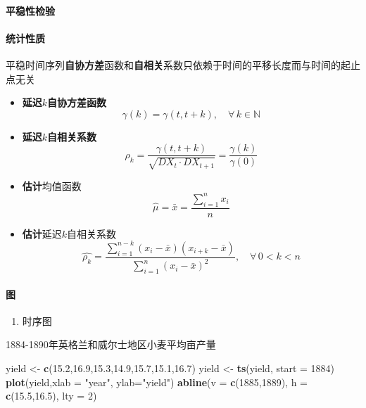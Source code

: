 \documentclass[]{article}
\newenvironment{Shaded}{\begin{snugshade}}{\end{snugshade}}
\newcommand{\DataTypeTok}[1]{\textcolor[rgb]{0.13,0.29,0.53}{#1}}
\newcommand{\DecValTok}[1]{\textcolor[rgb]{0.00,0.00,0.81}{#1}}
\newcommand{\FloatTok}[1]{\textcolor[rgb]{0.00,0.00,0.81}{#1}}
\newcommand{\KeywordTok}[1]{\textcolor[rgb]{0.13,0.29,0.53}{\textbf{#1}}}
\newcommand{\NormalTok}[1]{#1}
\newcommand{\StringTok}[1]{\textcolor[rgb]{0.31,0.60,0.02}{#1}}
\providecommand{\tightlist}{%
  \setlength{\itemsep}{0pt}\setlength{\parskip}{0pt}}
\let\oldparagraph\paragraph
\renewcommand{\paragraph}[1]{\oldparagraph{#1}\mbox{}}
\begin{document}
\hypertarget{ux5e73ux7a33ux6027ux68c0ux9a8c}{%
\paragraph{平稳性检验}\label{ux5e73ux7a33ux6027ux68c0ux9a8c}}

\hypertarget{ux7edfux8ba1ux6027ux8d28}{%
\paragraph{统计性质}\label{ux7edfux8ba1ux6027ux8d28}}

平稳时间序列\textbf{自协方差}函数和\textbf{自相关}系数只依赖于时间的平移长度而与时间的起止点无关

\begin{itemize}
\tightlist
\item
  \textbf{延迟\(k\)自协方差函数} \[
  \gamma(k) = \gamma(t,t+k),\quad\forall\,k\in\mathbb{N}
  \]
\item
  \textbf{延迟\(k\)自相关系数} \[
  \rho_k = \frac{\gamma(t,t+k)}{\sqrt{DX_t\cdot DX_{t+1}}} = \frac{\gamma(k)}{\gamma(0)}
  \]
\item
  \textbf{估计}均值函数 \[
  \hat{\mu} = \bar{x} = \frac{\sum\limits_{i=1}^{n}x_i}{n}
  \]
\item
  \textbf{估计}延迟\(k\)自相关系数 \[
  \hat{\rho_k} = \frac{\sum\limits_{i=1}^{n-k}(x_i-\bar{x})(x_{i+k}-\bar{x})}{\sum\limits_{i=1}^{n}(x_i-\bar{x})^2},\quad\forall\,0<k<n
  \]
\end{itemize}

\hypertarget{ux56fe}{%
\paragraph{图}\label{ux56fe}}

\begin{enumerate}
\def\labelenumi{\arabic{enumi}.}
\tightlist
\item
  时序图
\end{enumerate}

1884-1890年英格兰和威尔士地区小麦平均亩产量

\begin{Shaded}
\begin{Highlighting}[]
\NormalTok{yield <-}\StringTok{ }\KeywordTok{c}\NormalTok{(}\FloatTok{15.2}\NormalTok{,}\FloatTok{16.9}\NormalTok{,}\FloatTok{15.3}\NormalTok{,}\FloatTok{14.9}\NormalTok{,}\FloatTok{15.7}\NormalTok{,}\FloatTok{15.1}\NormalTok{,}\FloatTok{16.7}\NormalTok{)}
\NormalTok{yield <-}\StringTok{ }\KeywordTok{ts}\NormalTok{(yield, }\DataTypeTok{start =} \DecValTok{1884}\NormalTok{)}
\KeywordTok{plot}\NormalTok{(yield,}\DataTypeTok{xlab =} \StringTok{"year"}\NormalTok{, }\DataTypeTok{ylab=}\StringTok{"yield"}\NormalTok{)}
\KeywordTok{abline}\NormalTok{(}\DataTypeTok{v =} \KeywordTok{c}\NormalTok{(}\DecValTok{1885}\NormalTok{,}\DecValTok{1889}\NormalTok{), }
       \DataTypeTok{h =} \KeywordTok{c}\NormalTok{(}\FloatTok{15.5}\NormalTok{,}\FloatTok{16.5}\NormalTok{), }
       \DataTypeTok{lty =} \DecValTok{2}\NormalTok{)}
\end{Highlighting}
\end{Shaded}
\end{document}
